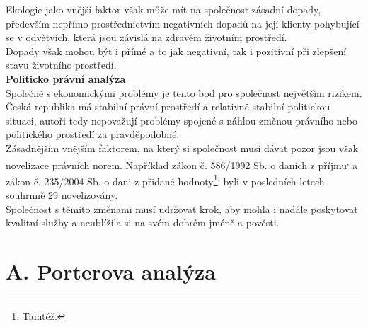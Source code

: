Ekologie jako vnější faktor však může mít na společnost zásadní dopady, především nepřímo prostřednictvím negativních dopadů na její klienty pohybující se v odvětvích, která jsou závislá na zdravém životním prostředí.\\

Dopady však mohou být i přímé a to jak negativní, tak i pozitivní při zlepšení stavu životního prostředí.\\

\noindent\textbf{Politicko právní analýza}\\

Společně s ekonomickými problémy je tento bod pro společnost největším rizikem. Česká republika má stabilní právní prostředí a relativně stabilní politickou situaci, autoři tedy nepovažují problémy spojené s náhlou změnou právního nebo politického prostředí za pravděpodobné.\\

Zásadnějším vnějším faktorem, na který si společnost musí dávat pozor jsou však novelizace právních norem. Například zákon č. 586/1992 Sb. o daních z příjmu\textsuperscript{,} a zákon č. 235/2004 Sb. o dani z přidané hodnoty\footnote{Tamtéž.}\textsuperscript{,} byli v posledních letech souhrnně 29 novelizovány.\\


Společnost s těmito změnami musí udržovat krok, aby mohla i nadále poskytovat kvalitní služby a neublížila si na svém dobrém jméně a pověsti.\\



\newpage

\section*{A. Porterova analýza}
\label{sec:Porterova analyza}

